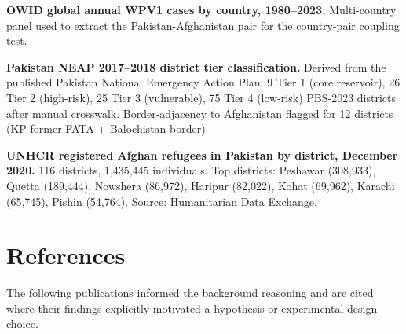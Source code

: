 \documentclass[11pt]{article}
\begin{document}
\begin{description}[itemsep=0.3em, leftmargin=2em, labelindent=0em]
\item[D8.] \textbf{OWID global annual WPV1 cases by country, 1980--2023.} Multi-country panel used to extract the Pakistan-Afghanistan pair for the country-pair coupling test.

\item[D9.] \textbf{Pakistan NEAP 2017--2018 district tier classification.} Derived from the published Pakistan National Emergency Action Plan; 9 Tier 1 (core reservoir), 26 Tier 2 (high-risk), 25 Tier 3 (vulnerable), 75 Tier 4 (low-risk) PBS-2023 districts after manual crosswalk. Border-adjacency to Afghanistan flagged for 12 districts (KP former-FATA + Balochistan border).

\item[D10.] \textbf{UNHCR registered Afghan refugees in Pakistan by district, December 2020.} 116 districts, 1{,}435{,}445 individuals. Top districts: Peshawar (308,933), Quetta (189,444), Nowshera (86,972), Haripur (82,022), Kohat (69,962), Karachi (65,745), Pishin (54,764). Source: Humanitarian Data Exchange.
\end{description}

\section{References}

The following publications informed the background reasoning and are cited where their findings explicitly motivated a hypothesis or experimental design choice.
\end{document}
